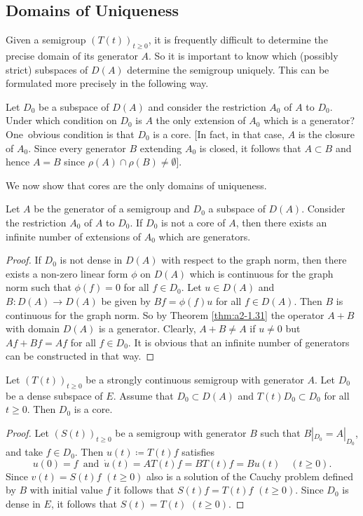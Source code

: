 \subsection{Domains of Uniqueness} \label{subsec:a2-1.se9}%
Given a semigroup $(T(t))_{t \geq 0}$,  
it is frequently difficult to determine the precise domain of its generator $A$.
So it is important to know which (possibly strict) subspaces of $D(A)$ determine the semigroup uniquely.
This can be formulated more precisely in the following way.

Let $D_{0}$ be a subspace of $D(A)$ and consider the restriction $A_{0}$ of $A$ to $D_{0}$.
Under which condition on $D_{0}$ is $A$ the only extension of $A_{0}$ which is a generator?
One~obvious condition is that $D_{0}$ is a core.
[In fact, in that case, $A$ is the closure of $A_{0}$.
Since every generator $B$ extending $A_{0}$ is closed, it follows that $A \subset B$ and hence $A = B$ since 
$\rho(A) \cap \rho(B) \neq \emptyset$].

We now show that cores are the only domains of uniqueness.

\begin{theorem}\label{thm:a2-1.33}
Let $A$ be the generator of a semigroup and $D_{0}$ a subspace of $D(A)$.
Consider the restriction $A_{0}$ of $A$ to $D_{0}$.
If $D_{0}$ is not a core of $A$, then there exists an infinite number of extensions of $A_{0}$ which are generators.
\end{theorem}
\begin{proof}
If $D_{0}$ is not dense in $D(A)$ with respect to the graph norm, then there exists a non-zero linear form $\phi$ on $D(A)$ which is continuous for the graph norm such that $\phi(f) = 0$ for all $f \in D_{0}$. 
Let $u \in D(A)$ and $B \colon D(A) \to D(A)$ be given by $Bf = \phi(f)u$ for all $f \in D(A)$.
Then $B$ is continuous for the graph norm.
So by Theorem \ref{thm:a2-1.31}   the operator $A+B$ with domain $D(A)$ is a generator.
Clearly, $A+B \neq A$ if $u \neq 0$ but $Af+Bf = Af$ for all $f \in D_{0}$.
It is obvious that an infinite number of generators can be constructed in that way.
\end{proof}
\begin{corollary}\label{cor:a2-1.34}
Let $(T(t))_{t\geq 0}$ be a strongly continuous semigroup with generator $A$.
Let $D_{0}$ be a dense subspace of $E$.
Assume that $D_{0} \subset D(A)$ and $T(t)D_{0} \subset D_{0}$ for all $t \geq 0$.
Then $D_{0}$ is a core.
\end{corollary}
\begin{proof}
Let $(S(t))_{t\geq 0}$ be a semigroup with generator $B$ such that $B|_{D_{0}} = A|_{D_{0}}$, and take $f \in D_{0}$.
Then $u(t) \coloneqq T(t)f$ satisfies 
\[
u(0) = f\,  \text{ and } \,\dot{u}(t) = AT(t)f = BT(t)f = Bu(t) \quad (t \geq 0).
\]
Since $v(t) = S(t)f$ $(t \geq 0)$ also is a solution of the Cauchy problem defined by $B$ with initial value $f$ it follows that $S(t)f = T(t)f$ $(t\geq 0)$.
Since $D_{0}$ is dense in $E$, it follows that $S(t) = T(t)$ $(t \geq 0)$.
\end{proof}
